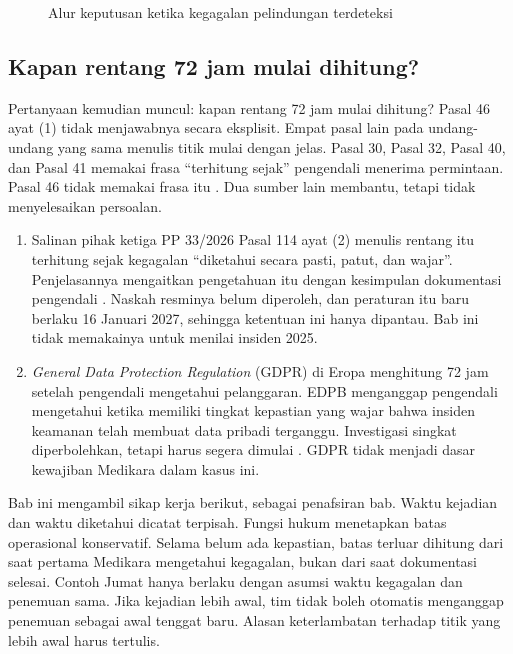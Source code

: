 \begin{figure}[!htb]
  \centering
  
  \caption{Alur keputusan ketika kegagalan pelindungan terdeteksi}
  \label{fig:ch07-insiden}
\end{figure}

\subsection*{Kapan rentang 72 jam mulai dihitung?}

Pertanyaan kemudian muncul: kapan rentang 72 jam mulai dihitung? Pasal 46 ayat (1) tidak menjawabnya
secara eksplisit. Empat pasal lain pada undang-undang yang sama menulis titik mulai dengan jelas.
Pasal 30, Pasal 32, Pasal 40, dan Pasal 41 memakai frasa ``terhitung sejak'' pengendali menerima
permintaan. Pasal 46 tidak memakai frasa itu \cite{uu27-2022-pdp}. Dua sumber lain membantu, tetapi
tidak menyelesaikan persoalan.

\begin{enumerate}
  \item Salinan pihak ketiga PP 33/2026 Pasal 114 ayat (2) menulis rentang itu terhitung sejak
  kegagalan ``diketahui secara pasti, patut, dan wajar''. Penjelasannya mengaitkan pengetahuan itu
  dengan kesimpulan dokumentasi pengendali \cite{c03-pp33-nonresmi}. Naskah resminya belum
  diperoleh, dan peraturan itu baru berlaku 16 Januari 2027, sehingga ketentuan ini hanya dipantau.
  Bab ini tidak memakainya untuk menilai insiden 2025.
  \item \textit{General Data Protection Regulation} (GDPR) di Eropa menghitung 72 jam setelah
  pengendali mengetahui pelanggaran. EDPB menganggap pengendali mengetahui ketika memiliki tingkat
  kepastian yang wajar bahwa insiden keamanan telah membuat data pribadi terganggu. Investigasi
  singkat diperbolehkan, tetapi harus segera dimulai \cite{c07-edpb-breach}. GDPR tidak menjadi
  dasar kewajiban Medikara dalam kasus ini.
\end{enumerate}

Bab ini mengambil sikap kerja berikut, sebagai penafsiran bab. Waktu kejadian dan waktu diketahui
dicatat terpisah. Fungsi hukum menetapkan batas operasional konservatif. Selama belum ada kepastian,
batas terluar dihitung dari saat pertama Medikara mengetahui kegagalan, bukan dari saat dokumentasi
selesai. Contoh Jumat hanya berlaku dengan asumsi waktu kegagalan dan penemuan sama. Jika kejadian
lebih awal, tim tidak boleh otomatis menganggap penemuan sebagai awal tenggat baru. Alasan
keterlambatan terhadap titik yang lebih awal harus tertulis.

